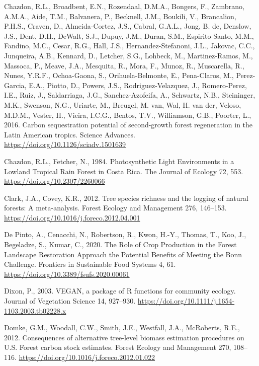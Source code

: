 \documentclass[
  12pt,
]{article}
\newlength{\cslhangindent}
\newlength{\cslentryspacingunit} %
\newenvironment{CSLReferences}[2] %
 {%
  \setlength{\parindent}{0pt}
  \ifodd #1
  \let\oldpar\par
  \def\par{\hangindent=\cslhangindent\oldpar}
  \fi
  \setlength{\parskip}{#2\cslentryspacingunit}
 }%
 {}
\begin{document}
\begin{CSLReferences}{1}{0}
\leavevmode{}%
Chazdon, R.L., Broadbent, E.N., Rozendaal, D.M.A., Bongers, F., Zambrano, A.M.A., Aide, T.M., Balvanera, P., Becknell, J.M., Boukili, V., Brancalion, P.H.S., Craven, D., Almeida-Cortez, J.S., Cabral, G.A.L., Jong, B. de, Denslow, J.S., Dent, D.H., DeWalt, S.J., Dupuy, J.M., Duran, S.M., Espirito-Santo, M.M., Fandino, M.C., Cesar, R.G., Hall, J.S., Hernandez-Stefanoni, J.L., Jakovac, C.C., Junqueira, A.B., Kennard, D., Letcher, S.G., Lohbeck, M., Martinez-Ramos, M., Massoca, P., Meave, J.A., Mesquita, R., Mora, F., Munoz, R., Muscarella, R., Nunes, Y.R.F., Ochoa-Gaona, S., Orihuela-Belmonte, E., Pena-Claros, M., Perez-Garcia, E.A., Piotto, D., Powers, J.S., Rodriguez-Velazquez, J., Romero-Perez, I.E., Ruiz, J., Saldarriaga, J.G., Sanchez-Azofeifa, A., Schwartz, N.B., Steininger, M.K., Swenson, N.G., Uriarte, M., Breugel, M. van, Wal, H. van der, Veloso, M.D.M., Vester, H., Vieira, I.C.G., Bentos, T.V., Williamson, G.B., Poorter, L., 2016. Carbon sequestration potential of second-growth forest regeneration in the {Latin American} tropics. Science Advances. \url{https://doi.org/10.1126/sciadv.1501639}

\leavevmode{}%
Chazdon, R.L., Fetcher, N., 1984. Photosynthetic {Light Environments} in a {Lowland Tropical Rain Forest} in {Costa Rica}. The Journal of Ecology 72, 553. \url{https://doi.org/10.2307/2260066}

\leavevmode{}%
Clark, J.A., Covey, K.R., 2012. Tree species richness and the logging of natural forests: {A} meta-analysis. Forest Ecology and Management 276, 146--153. \url{https://doi.org/10.1016/j.foreco.2012.04.001}

\leavevmode{}%
De Pinto, A., Cenacchi, N., Robertson, R., Kwon, H.-Y., Thomas, T., Koo, J., Begeladze, S., Kumar, C., 2020. The {Role} of {Crop Production} in the {Forest Landscape Restoration Approach} the {Potential Benefits} of {Meeting} the {Bonn Challenge}. Frontiers in Sustainable Food Systems 4, 61. \url{https://doi.org/10.3389/fsufs.2020.00061}

\leavevmode{}%
Dixon, P., 2003. {VEGAN}, a package of {R} functions for community ecology. Journal of Vegetation Science 14, 927--930. \url{https://doi.org/10.1111/j.1654-1103.2003.tb02228.x}

\leavevmode{}%
Domke, G.M., Woodall, C.W., Smith, J.E., Westfall, J.A., McRoberts, R.E., 2012. Consequences of alternative tree-level biomass estimation procedures on {U}.{S}. Forest carbon stock estimates. Forest Ecology and Management 270, 108--116. \url{https://doi.org/10.1016/j.foreco.2012.01.022}


\end{CSLReferences}
\end{document}
